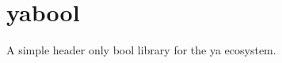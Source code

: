 \chapter{yabool}
\hypertarget{md_README}{}\label{md_README}
\label{md_README_autotoc_md1}%
%
 A simple header only bool library for the ya ecosystem. 